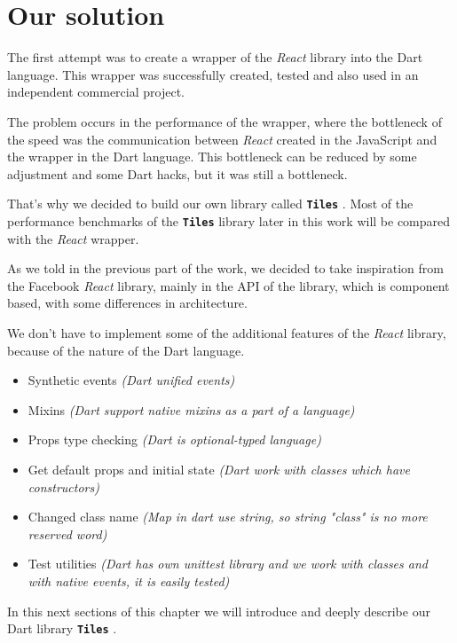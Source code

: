 \documentclass[oneside, 12pt]{book}
\newcommand{\tiles}[0]{\textbf{\texttt{Tiles}} }
\newcommand{\react}[0]{\textit{React} }
\newcommand{\facebook}[0]{Facebook }
\begin{document}

\chapter{Our solution}\label{chap:oursolution}

The first attempt was to create a wrapper of the \react library into the Dart language. 
This wrapper was successfully created, tested and also used in an independent commercial project. 

The problem occurs in the performance of the wrapper, 
where the bottleneck of the speed was the communication between \react created in the JavaScript and the wrapper in the Dart language. 
This bottleneck can be reduced by some adjustment and some Dart hacks, but it was still a bottleneck. 

That's why we decided to build our own library called \tiles.
Most of the performance benchmarks of the \tiles library later in this work will be compared with the \react wrapper. 

As we told in the previous part of the work, 
we decided to take inspiration from the \facebook \react library,
mainly in the API of the library, which is component based, 
with some differences in architecture.

We don't have to implement some of the additional features of the \react library, because of the nature of the Dart language.
\begin{itemize}
  \item Synthetic events \textit{(Dart unified events)}
  \item Mixins \textit{(Dart support native mixins as a part of a language)}
  \item Props type checking \textit{(Dart is optional-typed language)}
  \item Get default props and initial state \textit{(Dart work with classes which have constructors)}
  \item Changed class name \textit{(Map in dart use string, so string "class" is no more reserved word)}
  \item Test utilities \textit{(Dart has own unittest library and we work with classes and with native events, it is easily tested)}
\end{itemize}

In this next sections of this chapter we will introduce and deeply describe our Dart library \tiles.
\end{document}
